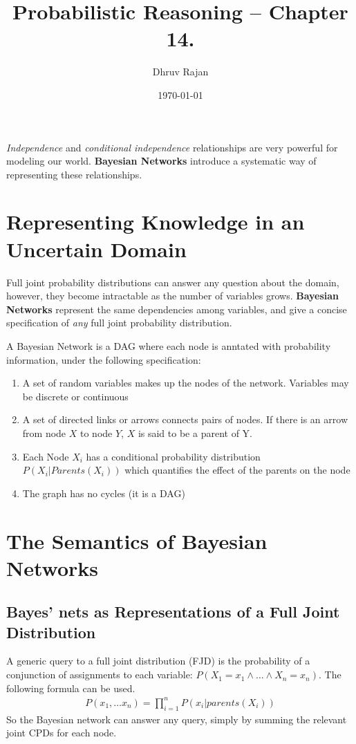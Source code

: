 \documentclass[12pt]{article}
\begin{document}
\title{Probabilistic Reasoning -- Chapter 14.}
\author{Dhruv Rajan}
\date{\today}
\maketitle

\textit{Independence} and \textit{conditional independence}
relationships are very powerful for modeling our
world. \textbf{Bayesian Networks} introduce a systematic way of
representing these relationships.

\section{Representing Knowledge in an Uncertain Domain}
Full joint probability distributions can answer any question about the
domain, however, they become intractable as the number of variables
grows. \textbf{Bayesian Networks} represent the same dependencies
among variables, and give a concise specification of \textit{any} full
joint probability distribution.

A Bayesian Network is a DAG where each node is anntated with
probability information, under the following specification:
\begin{enumerate}
\item A set of random variables makes up the nodes of the
  network. Variables may be discrete or continuous
\item A set of directed links or arrows connects pairs of nodes. If
  there is an arrow from node $X$ to node $Y$, $X$ is said to be a
  parent of Y.
\item Each Node $X_i$ has a conditional probability distribution
  $P(X_i | Parents(X_i))$ which quantifies the effect of the parents
  on the node
\item The graph has no cycles (it is a DAG)
\end{enumerate}

\section{The Semantics of Bayesian Networks}
\subsection{Bayes' nets as Representations of a Full Joint Distribution}
A generic query to a full joint distribution (FJD) is the probability
of a conjunction of assignments to each variable:
$P(X_1 = x_1 \land \dots \land X_n = x_n)$. The following formula can
be used.
\begin{align}
  P(x_1, \dots x_n) = \prod_{i = 1}^{n} P(x_i | parents(X_i))
\end{align}
So the Bayesian network can answer any query, simply by summing the
relevant joint CPDs for each node.
\end{document}
